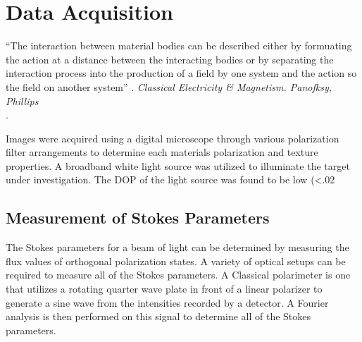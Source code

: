 \chapter{Data Acquisition}
\begin{center}
  \begin{minipage}{0.75\textwidth}
    \begin{small}
      “The interaction between material bodies can be described either by formuating the action at a distance between the interacting bodies or by separating the interaction process into the production of a field by one system and the action so the field on another system” .
      \emph{Classical Electricity \& Magnetism. Panofksy, Phillips}\\.
    \end{small}
  \end{minipage}
  \vspace{0.5cm}
\end{center}

Images were acquired using a digital microscope through various polarization filter arrangements to determine each materials polarization and texture properties.  A broadband white light source was utilized to illuminate the target under investigation.  The DOP of the light source was found to be low (<.02%

\section{Measurement of Stokes Parameters}
The Stokes parameters for a beam of light can be determined by measuring the flux values of orthogonal polarization states.  A variety of optical setups can be required to measure all of the Stokes parameters.  A Classical polarimeter is one that utilizes a rotating quarter wave plate in front of a linear polarizer to generate a sine wave from the intensities recorded by a detector.  A Fourier analysis is then performed on this signal to determine all of the Stokes parameters.

